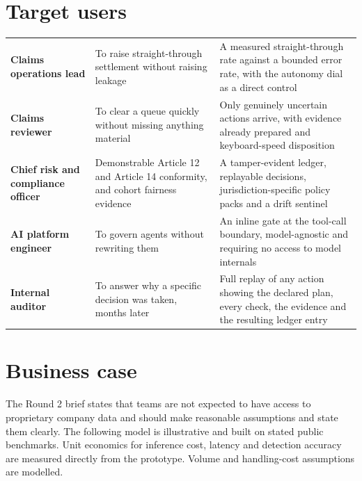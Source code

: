 \documentclass[10pt]{article}
\begin{document}
\section{Target users}

\vspace{2pt}
{\small
\begin{xltabular}{\textwidth}{@{}L{0.215\textwidth}L{0.245\textwidth}Y@{}}
\toprule
{} &  &  \\
\midrule
\textbf{Claims operations lead} & To raise straight-through settlement without raising leakage & A measured straight-through rate against a bounded error rate, with the autonomy dial as a direct control \\
\textbf{Claims reviewer} & To clear a queue quickly without missing anything material & Only genuinely uncertain actions arrive, with evidence already prepared and keyboard-speed disposition \\
\textbf{Chief risk and compliance officer} & Demonstrable Article 12 and Article 14 conformity, and cohort fairness evidence & A tamper-evident ledger, replayable decisions, jurisdiction-specific policy packs and a drift sentinel \\
\textbf{AI platform engineer} & To govern agents without rewriting them & An inline gate at the tool-call boundary, model-agnostic and requiring no access to model internals \\
\textbf{Internal auditor} & To answer why a specific decision was taken, months later & Full replay of any action showing the declared plan, every check, the evidence and the resulting ledger entry \\
\bottomrule
\end{xltabular}}

\section{Business case}

\begin{callout}
The Round 2 brief states that teams are not expected to have access to proprietary company
data and should make reasonable assumptions and state them clearly. The following model is
illustrative and built on stated public benchmarks. Unit economics for inference cost,
latency and detection accuracy are measured directly from the prototype. Volume and
handling-cost assumptions are modelled.
\end{callout}
\end{document}
